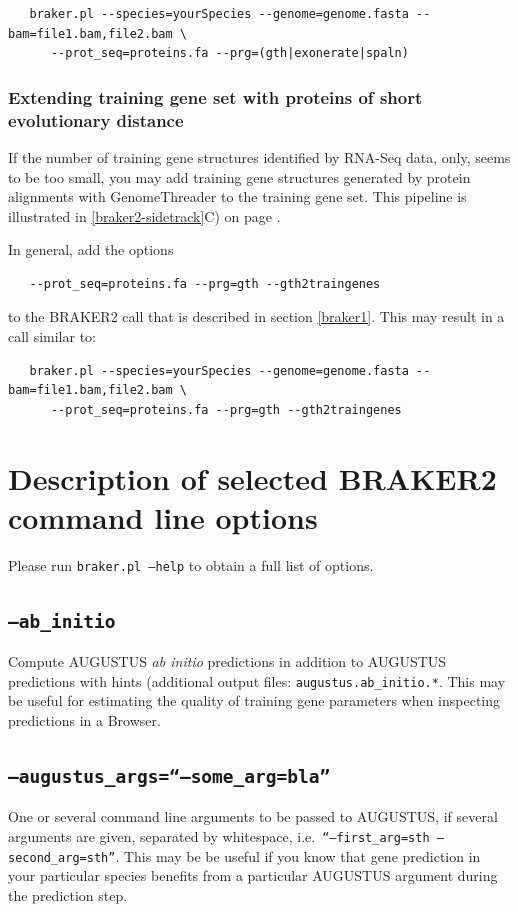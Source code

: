 \documentclass[a4paper,10pt]{report}
\begin{document}
\begin{verbatim}
   braker.pl --species=yourSpecies --genome=genome.fasta --bam=file1.bam,file2.bam \
      --prot_seq=proteins.fa --prg=(gth|exonerate|spaln)
\end{verbatim}

\subsubsection{Extending training gene set with proteins of short evolutionary distance}

If the number of training gene structures identified by RNA-Seq data, only, seems to be too small, you may add training gene structures generated by protein alignments with GenomeThreader to the training gene set. This pipeline is illustrated in \ref{braker2-sidetrack}C) on page \pageref{braker2-sidetrack}.

In general, add the options

\begin{verbatim}
   --prot_seq=proteins.fa --prg=gth --gth2traingenes
\end{verbatim}

to the BRAKER2 call that is described in section \ref{braker1}. This may result in a call similar to:

\begin{verbatim}
   braker.pl --species=yourSpecies --genome=genome.fasta --bam=file1.bam,file2.bam \
      --prot_seq=proteins.fa --prg=gth --gth2traingenes
\end{verbatim}

\section{Description of selected BRAKER2 command line options}\label{options}

Please run \texttt{braker.pl --help} to obtain a full list of options.

\subsection{\texttt{--ab\_initio}}

Compute AUGUSTUS \textit{ab initio} predictions in addition to AUGUSTUS predictions with hints (additional output files: \texttt{augustus.ab\_initio.*}. This may be useful for estimating the quality of training gene parameters when inspecting predictions in a Browser.

\subsection{\texttt{--augustus\_args=``--some\_arg=bla''}}     
One or several command line arguments to be passed to AUGUSTUS, if several arguments are given, separated by whitespace, i.e.~\texttt{``--first\_arg=sth --second\_arg=sth''}. This may be be useful if you know that gene prediction in your particular species benefits from a particular AUGUSTUS argument during the prediction step.  
    
\end{document}
